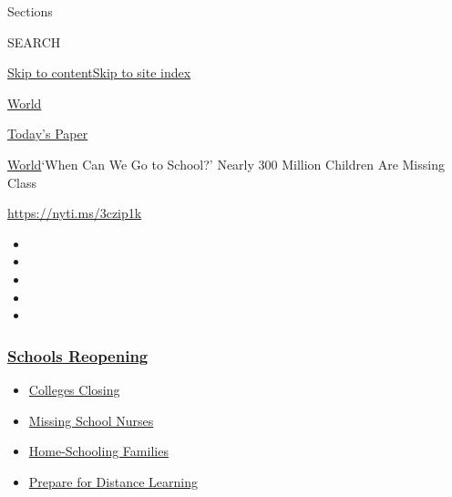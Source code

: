 Sections

SEARCH

\protect\hyperlink{site-content}{Skip to
content}\protect\hyperlink{site-index}{Skip to site index}

\href{https://www.nytimes3xbfgragh.onion/section/world}{World}

\href{https://myaccount.nytimes3xbfgragh.onion/auth/login?response_type=cookie\&client_id=vi}{}

\href{https://www.nytimes3xbfgragh.onion/section/todayspaper}{Today's
Paper}

\href{/section/world}{World}\textbar{}`When Can We Go to School?' Nearly
300 Million Children Are Missing Class

\url{https://nyti.ms/3czip1k}

\begin{itemize}
\item
\item
\item
\item
\item
\end{itemize}

\hypertarget{schools-reopening}{%
\subsubsection{\texorpdfstring{\href{https://www.nytimes3xbfgragh.onion/spotlight/schools-reopening?name=styln-coronavirus-schools-reopening\&region=TOP_BANNER\&variant=undefined\&block=storyline_menu_recirc\&action=click\&pgtype=Article\&impression_id=5ec19ee0-e3b3-11ea-bb74-cba9f9382aeb}{Schools
Reopening}}{Schools Reopening}}\label{schools-reopening}}

\begin{itemize}
\tightlist
\item
  \href{https://www.nytimes3xbfgragh.onion/2020/08/19/us/colleges-closing-covid.html?name=styln-coronavirus-schools-reopening\&region=TOP_BANNER\&variant=undefined\&block=storyline_menu_recirc\&action=click\&pgtype=Article\&impression_id=5ec19ee1-e3b3-11ea-bb74-cba9f9382aeb}{Colleges
  Closing}
\item
  \href{https://www.nytimes3xbfgragh.onion/2020/08/20/us/schools-reopening-nurses-covid.html?name=styln-coronavirus-schools-reopening\&region=TOP_BANNER\&variant=undefined\&block=storyline_menu_recirc\&action=click\&pgtype=Article\&impression_id=5ec19ee2-e3b3-11ea-bb74-cba9f9382aeb}{Missing
  School Nurses}
\item
  \href{https://www.nytimes3xbfgragh.onion/2020/08/18/parenting/homeschool-families.html?name=styln-coronavirus-schools-reopening\&region=TOP_BANNER\&variant=undefined\&block=storyline_menu_recirc\&action=click\&pgtype=Article\&impression_id=5ec19ee3-e3b3-11ea-bb74-cba9f9382aeb}{Home-Schooling
  Families}
\item
  \href{https://www.nytimes3xbfgragh.onion/2020/08/05/parenting/parents-distance-learning.html?name=styln-coronavirus-schools-reopening\&region=TOP_BANNER\&variant=undefined\&block=storyline_menu_recirc\&action=click\&pgtype=Article\&impression_id=5ec1c5f0-e3b3-11ea-bb74-cba9f9382aeb}{Prepare
  for Distance Learning}
\end{itemize}

